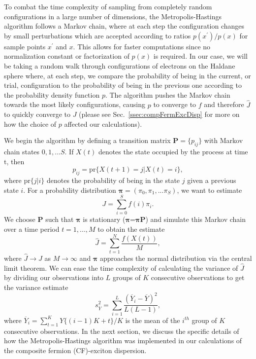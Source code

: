     To combat the time complexity of sampling from completely random configurations in a large number of dimensions, the Metropolis-Hastings algorithm follows a Markov chain, where at each step the configuration changes by small perturbations which are accepted according to ratios $p(x^\prime)/p(x)$ for sample points $x^\prime$ and $x$. This allows for faster computations since no normalization constant or factorization of $p(x)$ is required. In our case, we will be taking a random walk through configurations of electrons on the Haldane sphere where, at each step, we compare the probability of being in the current, or trial, configuration to the probability of being in the previous one according to the probability density function $p$. The algorithm pushes the Markov chain towards the most likely configurations, causing $p$ to converge to $f$ and therefore $\hat{J}$ to quickly converge to $J$ (please see Sec.~\ref{ssec:compFermExcDisp} for more on how the choice of $p$ affected our calculations).
    
    We begin the algorithm by defining a transition matrix $\mathbf{P}=\{p_{ij}\}$ with Markov chain states $0,1,...S$. If $X(t)$ denotes the state occupied by the process at time t, then
    \begin{equation} \label{transMatr}
    p_{ij}=\text{pr}\{X(t+1)=j|X(t)=i\},
    \end{equation}
    where pr$\{j|i\}$ denotes the probability of being in the state $j$ given a previous state $i$. For a probability distribution $\mathbf{\pi}=(\pi_0,\pi_1,...\pi_S)$, we want to estimate
    \begin{equation} \label{mhInt}
    J=\sum_{i=0}^Sf(i)\pi_i.
    \end{equation}
    We choose $\mathbf{P}$ such that $\mathbf{\pi}$ is stationary ($\mathbf{\pi}$=$\mathbf{\pi P}$) and simulate this Markov chain over a time period $t=1,...,M$ to obtain the estimate
    \begin{equation} \label{mhEst}
    \hat{J}=\sum_{t=1}^N\frac{f(X(t))}{M},
    \end{equation}
    where $\hat{J}\rightarrow J$ as $M\rightarrow\infty$ and $\mathbf{\pi}$ approaches the normal distribution via the central limit theorem. We can ease the time complexity of calculating the variance of $\hat{J}$ by dividing our observations into $L$ groups of $K$ consecutive observations to get the variance estimate
    \begin{equation} \label{mcmcVar}
    s_{\overline{Y}}^2=\sum_{i=1}^L\frac{(\overline{Y}_i-\overline{Y})^2}{L(L-1)},
    \end{equation}
    where $\overline{Y}_i=\sum_{t=1}^KY\{(i-1)K+t\}/K$ is the mean of the $i^{th}$ group of $K$ consecutive observations. In the next section, we discuss the specific details of how the Metropolis-Hastings algorithm was implemented in our calculations of the composite fermion (CF)-exciton dispersion.
    
